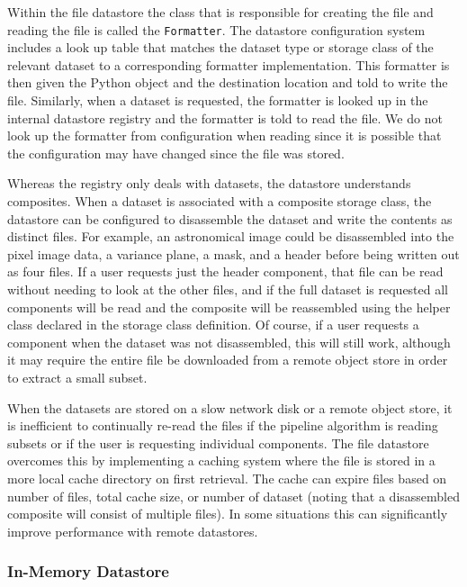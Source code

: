 \documentclass[]{spie}
\begin{document}
Within the file datastore the class that is responsible for creating the file and reading the file is called the \texttt{Formatter}.
The datastore configuration system includes a look up table that matches the dataset type or storage class of the relevant dataset to a corresponding formatter implementation.
This formatter is then given the Python object and the destination location and told to write the file.
Similarly, when a dataset is requested, the formatter is looked up in the internal datastore registry and the formatter is told to read the file.
We do not look up the formatter from configuration when reading since it is possible that the configuration may have changed since the file was stored.

Whereas the registry only deals with datasets, the datastore understands composites.
When a dataset is associated with a composite storage class, the datastore can be configured to disassemble the dataset and write the contents as distinct files.
For example, an astronomical image could be disassembled into the pixel image data, a variance plane, a mask, and a header before being written out as four files.
If a user requests just the header component, that file can be read without needing to look at the other files, and if the full dataset is requested all components will be read and the composite will be reassembled using the helper class declared in the storage class definition.
Of course, if a user requests a component when the dataset was not disassembled, this will still work, although it may require the entire file be downloaded from a remote object store in order to extract a small subset.

When the datasets are stored on a slow network disk or a remote object store, it is inefficient to continually re-read the files if the pipeline algorithm is reading subsets or if the user is requesting individual components.
The file datastore overcomes this by implementing a caching system where the file is stored in a more local cache directory on first retrieval.
The cache can expire files based on number of files, total cache size, or number of dataset (noting that a disassembled composite will consist of multiple files).
In some situations this can significantly improve performance with remote datastores.

\subsubsection{In-Memory Datastore}
\end{document}
